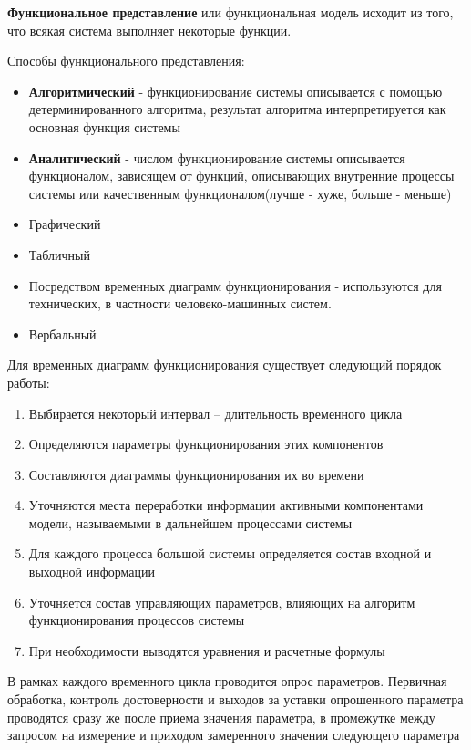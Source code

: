 \documentclass[a4paper]{article}
\begin{document}
	\textbf{Функциональное представление} или функциональная модель исходит из того, что всякая система выполняет некоторые функции.
	
	Способы функционального представления:
	\begin{itemize}
		\item \textbf{Алгоритмический} - функционирование системы описывается с помощью детерминированного алгоритма, результат алгоритма интерпретируется как основная функция системы
		\item \textbf{Аналитический} - числом функционирование системы описывается функционалом, зависящем от функций, описывающих внутренние процессы системы или  качественным функционалом(лучше - хуже, больше - меньше)
		\item Графический
		\item Табличный
		\item Посредством временных диаграмм функционирования - используются для технических, в частности человеко-машинных систем.
		\item Вербальный
	\end{itemize}

	Для временных диаграмм функционирования существует следующий порядок работы:
	\begin{enumerate}
		\item Выбирается некоторый интервал – длительность временного цикла
		\item Определяются параметры функционирования этих компонентов
		\item Составляются диаграммы функционирования их во времени
		\item Уточняются места переработки информации активными компонентами модели, называемыми в дальнейшем процессами системы
		\item Для каждого процесса большой системы определяется состав входной и выходной информации
		\item Уточняется состав управляющих параметров, влияющих на алгоритм функционирования процессов системы
		\item При необходимости выводятся уравнения и расчетные формулы
	\end{enumerate}

	В рамках каждого временного цикла проводится опрос параметров. Первичная обработка, контроль достоверности и выходов за уставки опрошенного параметра проводятся сразу же после приема значения параметра, в промежутке между запросом на измерение и приходом замеренного значения следующего параметра
	
\end{document}
